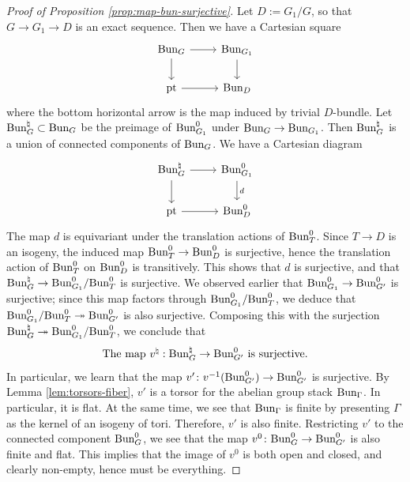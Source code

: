 \documentclass[reqno]{amsart}
\numberwithin{equation}{subsection}
\theoremstyle{definition}
\newcommand{\Bun}{\textup{Bun}}
\newcommand\pt{\textup{pt}}
\newcommand{\surj}{\twoheadrightarrow}
\newcommand\na{\natural}
\newcommand{\co}{\colon}
\begin{document}
\begin{proof}[Proof of Proposition \ref{prop:map-bun-surjective}]
Let $D := G_1/G$, so that $G \rightarrow G_1 \rightarrow D$ is an exact sequence. Then we have a Cartesian square
\begin{equation}\label{eq:cart-sq-1}
\begin{tikzcd}
\Bun_G \ar[r] \ar[d]  & \Bun_{G_1} \ar[d] \\
\pt \ar[r] & \Bun_{D} 
\end{tikzcd}
\end{equation}
where the bottom horizontal arrow is the map induced by trivial $D$-bundle. Let $\Bun_G^\na\subset \Bun_G$ be the preimage of $\Bun^0_{G_1}$ under $\Bun_G\to \Bun_{G_1}$. Then $\Bun_G^\na$ is a union of connected components of $\Bun_G$. We have a Cartesian diagram
\begin{equation*}
\begin{tikzcd}
\Bun_G^\na \ar[r] \ar[d]  & \Bun_{G_1}^0 \ar[d, "d"] \\
\pt \ar[r] & \Bun_{D}^0 
\end{tikzcd}
\end{equation*}
The map $d$ is equivariant under the translation actions of $\Bun_T^0$. Since $T\to D$ is an isogeny, the induced map $\Bun_T^0\to \Bun_D^0$ is surjective, hence the translation action of $\Bun_T^0$ on $\Bun_D^0$ is  transitively. This shows that $d$ is surjective, and that $\Bun_G^\na\to \Bun^0_{G_1}/\Bun_T^0$ is surjective. We observed earlier that $\Bun_{G_1}^0 \rightarrow \Bun_{G'}^0$ is surjective; since this map factors through $\Bun_{G_1}^0/\Bun_{T}^0$, we deduce that $\Bun_{G_1}^0/\Bun_{T}^0 \surj \Bun_{G'}^0$ is also surjective. Composing this with the surjection $\Bun_G^\na \surj \Bun_{G_1}^0/\Bun_{T}^0$, we conclude that
\begin{equation}\label{Bun na surj}
    \mbox{The map $v^\na: \Bun^\na_G\to \Bun^0_{G'}$ is surjective.}
\end{equation}
In particular, we learn that the map $v' \co v^{-1}(\Bun^0_{G'}) \rightarrow \Bun^0_{G'}$ is surjective. By Lemma \ref{lem:torsors-fiber}, $v'$ is a torsor for the abelian group stack $\Bun_{\Gamma}$. In particular, it is flat. At the same time, we see that $\Bun_{\Gamma}$ is finite by presenting $\Gamma$ as the kernel of an isogeny of tori. Therefore, $v'$ is also finite. Restricting $v'$ to the connected component $\Bun_G^0$, we see that the map $v^0\colon \Bun^0_G\rightarrow\Bun^0_{G'}$ is also finite and flat. This implies that the image of $v^0$ is both open and closed, and clearly non-empty, hence must be everything.




\end{proof}
\end{document}
